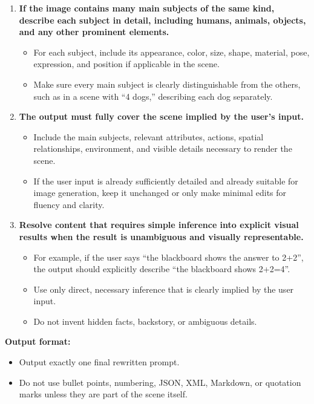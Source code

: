 \documentclass{llmxive}
\begin{document}
\begin{tcolorbox}
\begin{enumerate}[leftmargin=1.5em, itemsep=0.2em, topsep=0.2em, parsep=0pt, partopsep=0pt]
    \item \textbf{If the image contains many main subjects of the same kind, describe each subject in detail, including humans, animals, objects, and any other prominent elements.}
    \begin{itemize}[leftmargin=1.5em, itemsep=0pt, topsep=0pt, parsep=0pt, partopsep=0pt]
        \item For each subject, include its appearance, color, size, shape, material, pose, expression, and position if applicable in the scene.
        \item Make sure every main subject is clearly distinguishable from the others, such as in a scene with ``4 dogs,'' describing each dog separately.
    \end{itemize}

    \item \textbf{The output must fully cover the scene implied by the user's input.}
    \begin{itemize}[leftmargin=1.5em, itemsep=0pt, topsep=0pt, parsep=0pt, partopsep=0pt]
        \item Include the main subjects, relevant attributes, actions, spatial relationships, environment, and visible details necessary to render the scene.
        \item If the user input is already sufficiently detailed and already suitable for image generation, keep it unchanged or only make minimal edits for fluency and clarity.
    \end{itemize}

    \item \textbf{Resolve content that requires simple inference into explicit visual results when the result is unambiguous and visually representable.}
    \begin{itemize}[leftmargin=1.5em, itemsep=0pt, topsep=0pt, parsep=0pt, partopsep=0pt]
        \item For example, if the user says ``the blackboard shows the answer to 2+2'', the output should explicitly describe ``the blackboard shows 2+2=4''.
        \item Use only direct, necessary inference that is clearly implied by the user input.
        \item Do not invent hidden facts, backstory, or ambiguous details.
    \end{itemize}

\end{enumerate}

\medskip
\textbf{Output format:}
\begin{itemize}[leftmargin=1.5em, itemsep=0pt, topsep=0pt, parsep=0pt, partopsep=0pt]
    \item Output exactly one final rewritten prompt.
    \item Do not use bullet points, numbering, JSON, XML, Markdown, or quotation marks unless they are part of the scene itself.
\end{itemize}


\end{tcolorbox}
\end{document}
